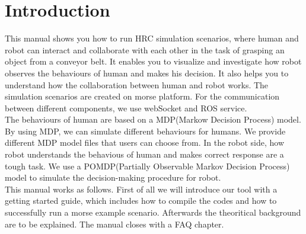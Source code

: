 \chapter{Introduction} 

This manual shows you how to run HRC simulation scenarios, where human and robot can interact and collaborate with each other in the task of grasping an object from a conveyor belt. It enables you to visualize and investigate how robot observes the behaviours of human and makes his decision. It also helps you to understand how the collaboration between human and robot works. The simulation scenarios are created on morse platform. For the communication between different components, we use webSocket and ROS service.\\

The behaviours of human are based on a MDP(Markow Decision Process) model. By using MDP, we can simulate different behaviours for humans. We provide different MDP model files that users can choose from. In the robot side, how robot understands the behavious of human and makes correct response are a tough task. We use a POMDP(Partially Observable Markov Decision Process) model to simulate the decision-making procedure for robot.\\

This manual works as follows. First of all we will introduce our tool with a getting started guide, which includes how to compile the codes and how to successfully run a morse example scenario. Afterwards the theoritical background are to be explained. The manual closes with a FAQ chapter.  
\newpage
